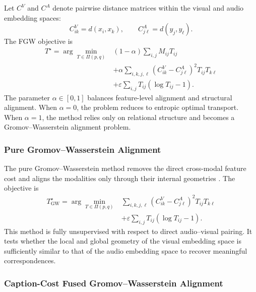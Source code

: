 Let $C^V$ and $C^A$ denote pairwise distance matrices within the visual and audio embedding spaces:
\begin{equation}
    C^V_{ik} = d(x_i,x_k),
    \qquad
    C^A_{j\ell} = d(y_j,y_\ell).
\end{equation}
The FGW objective is
\begin{equation}
\begin{split}
    T^{\star}
    =
    \arg\min_{T \in \Pi(p,q)}
    &
    (1-\alpha)
    \sum_{i,j} M_{ij} T_{ij}
    \\
    &
    +
    \alpha
    \sum_{i,k,j,\ell}
    \left(
    C^V_{ik} - C^A_{j\ell}
    \right)^2
    T_{ij}T_{k\ell}
    \\
    &
    +
    \varepsilon
    \sum_{i,j}
    T_{ij}
    \left(
    \log T_{ij} - 1
    \right).
\end{split}
\label{eq:fgw}
\end{equation}
The parameter $\alpha \in [0,1]$ balances feature-level alignment and structural alignment. When $\alpha=0$, the problem reduces to entropic optimal transport. When $\alpha=1$, the method relies only on relational structure and becomes a Gromov--Wasserstein alignment problem.

\subsubsection{Pure Gromov--Wasserstein Alignment}
\label{subsubsec:gw}

The pure Gromov--Wasserstein method removes the direct cross-modal feature cost and aligns the modalities only through their internal geometries \cite{peyre2016gromov}. The objective is
\begin{equation}
\begin{split}
    T^{\star}_{\mathrm{GW}}
    =
    \arg\min_{T \in \Pi(p,q)}
    &
    \sum_{i,k,j,\ell}
    \left(
    C^V_{ik} - C^A_{j\ell}
    \right)^2
    T_{ij}T_{k\ell}
    \\
    &
    +
    \varepsilon
    \sum_{i,j}
    T_{ij}
    \left(
    \log T_{ij} - 1
    \right).
\end{split}
\label{eq:gw}
\end{equation}
This method is fully unsupervised with respect to direct audio--visual pairing. It tests whether the local and global geometry of the visual embedding space is sufficiently similar to that of the audio embedding space to recover meaningful correspondences.

\subsubsection{Caption-Cost Fused Gromov--Wasserstein Alignment}
\label{subsubsec:caption_fgw}

